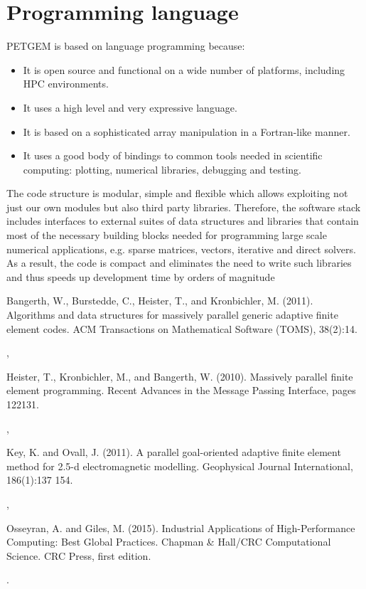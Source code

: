 \documentclass[letterpaper,10pt,english]{sphinxmanual}
\begin{document}
\section{Programming language}
\label{\detokenize{Features:programming-language}}\label{\detokenize{Features:id3}}
PETGEM is based on  language
programming because:
\begin{itemize}
\item {} 
It is open source and functional on a wide number of platforms, including HPC environments.

\item {} 
It uses a high level and very expressive language.

\item {} 
It is based on a sophisticated array manipulation in a Fortran-like manner.

\item {} 
It uses a good body of bindings to common tools needed in scientific computing: plotting, numerical libraries, debugging and testing.

\end{itemize}

The code structure is modular, simple and flexible which allows exploiting
not just our own modules but also third party libraries. Therefore,
the software stack includes interfaces to external suites of data structures
and libraries that contain most of the necessary building blocks needed
for programming large scale numerical applications, e.g. sparse matrices,
vectors, iterative and direct solvers. As a result,
the code is compact and eliminates the need to write such libraries
and thus speeds up development time by orders of magnitude %
\begin{footnote}[1]\sphinxAtStartFootnote
Bangerth, W., Burstedde, C., Heister, T., and Kronbichler, M. (2011). Algorithms and data structures for massively parallel generic adaptive finite element codes. ACM Transactions on Mathematical Software (TOMS), 38(2):14.
%
\end{footnote}, %
\begin{footnote}[2]\sphinxAtStartFootnote
Heister, T., Kronbichler, M., and Bangerth, W. (2010). Massively parallel finite element programming. Recent Advances in the Message Passing Interface, pages 122\textendash{}131.
%
\end{footnote},
%
\begin{footnote}[3]\sphinxAtStartFootnote
Key, K. and Ovall, J. (2011). A parallel goal-oriented adaptive finite element method for 2.5-d electromagnetic modelling. Geophysical Journal International, 186(1):137\textendash{} 154.
%
\end{footnote}, %
\begin{footnote}[4]\sphinxAtStartFootnote
Osseyran, A. and Giles, M. (2015). Industrial Applications of High-Performance Computing: Best Global Practices. Chapman \& Hall/CRC Computational Science. CRC Press, first edition.
%
\end{footnote}.
\end{document}
